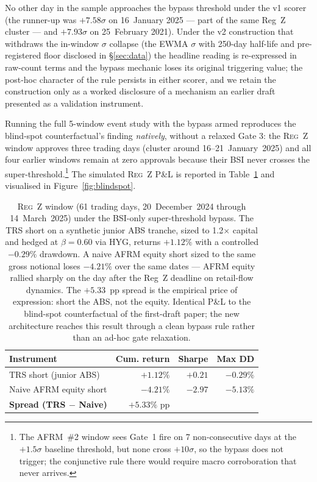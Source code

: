 \documentclass[11pt,letterpaper]{article}
\begin{document}
No other day in the sample approaches the bypass threshold under the
v1 scorer (the runner-up was $+7.58\sigma$ on 16~January 2025 --- part
of the same Reg~Z cluster --- and $+7.93\sigma$ on 25~February 2021).
Under the v2 construction that withdraws the in-window $\sigma$
collapse (the EWMA $\sigma$ with 250-day half-life and pre-registered
floor disclosed in \S\ref{sec:data}) the headline reading is re-expressed
in raw-count terms and the bypass mechanic loses its original
triggering value; the post-hoc character of the rule persists in
either scorer, and we retain the construction only as a worked
disclosure of a mechanism an earlier draft presented as a validation
instrument.

Running the full 5-window event study with the bypass armed
reproduces the blind-spot counterfactual's finding \emph{natively},
without a relaxed Gate 3: the \textsc{Reg~Z} window approves three
trading days (cluster around 16--21~January~2025) and all four
earlier windows remain at zero approvals because their BSI never
crosses the super-threshold.\footnote{The \textsc{AFRM~\#2} window
sees Gate~1 fire on 7 non-consecutive days at the $+1.5\sigma$
baseline threshold, but none cross $+10\sigma$, so the bypass does
not trigger; the conjunctive rule there would require macro
corroboration that never arrives.} The simulated \textsc{Reg~Z} P\&L
is reported in Table~\ref{tab:blindspot} and visualised in
Figure~\ref{fig:blindspot}.

\begin{table}[H]
\centering
\small
\begin{tabular}{lrrr}
\toprule
\textbf{Instrument} & \textbf{Cum. return} &
\textbf{Sharpe} & \textbf{Max DD}\\
\midrule
TRS short (junior ABS) &  $+1.12\%$ & $+0.21$ & $-0.29\%$\\
Naive AFRM equity short & $-4.21\%$ & $-2.97$ & $-5.13\%$\\
\midrule
\textbf{Spread (TRS $-$ Naive)} & $+5.33\%$ pp & & \\
\bottomrule
\end{tabular}
\caption{\textsc{Reg~Z} window (61 trading days, 20~December~2024
through 14~March~2025) under the BSI-only super-threshold bypass.
The TRS short on a synthetic junior ABS tranche, sized to
1.2$\times$ capital and hedged at $\beta=0.60$ via HYG, returns
$+1.12\%$ with a controlled $-0.29\%$ drawdown. A naive AFRM equity
short sized to the same gross notional loses $-4.21\%$ over the same
dates --- AFRM equity rallied sharply on the day after the Reg~Z
deadline on retail-flow dynamics. The $+5.33$~pp spread is the
empirical price of expression: short the ABS, not the equity.
Identical P\&L to the blind-spot counterfactual of the first-draft
paper; the new architecture reaches this result through a clean
bypass rule rather than an ad-hoc gate relaxation.}
\label{tab:blindspot}
\end{table}
\end{document}

